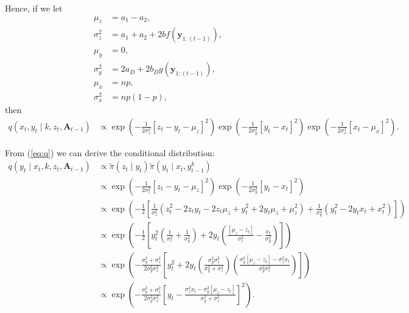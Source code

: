 \documentclass[a4paper]{article}
\newcommand{\by}{\bm{y}}
\newcommand{\bA}{\bm{A}}
\begin{document}
Hence, if we let 
\begin{align*}
    \mu_z &= a_1 - a_2,\\
    \sigma^2_z &= a_1 + a_2 + 2b f\left(\by_{1:(t - 1)}\right),\\
    \mu_y &= 0,\\
    \sigma^2_y &= 2a_D + 2b_D g\left(\by_{1:(t - 1)}\right),\\
    \mu_x &= np,\\
    \sigma^2_x &= np(1 - p),
\end{align*}
then
\begin{align}
    q\left(x_t, y_t \mid k, z_t, \bA_{t - 1}\right) &\propto \exp\left(-\frac{1}{2\sigma^2_z}\left[z_t - y_t - \mu_z\right]^2\right)\exp\left(-\frac{1}{2\sigma^2_y}\left[y_t - x_t\right]^2\right)\exp\left(-\frac{1}{2\sigma^2_x}\left[x_t - \mu_x\right]^2\right).\label{eq:q}
\end{align}

From (\ref{eq:q}) we can derive the conditional distribution:
\begin{align}
    q\left(y_t \mid x_t, k, z_t, \bA_{t - 1}\right) &\propto \tilde{\pi}\left(z_t \mid y_t\right)\tilde{\pi}\left(y_t \mid x_t, y^k_{t - 1}\right)\nonumber\\
    &\propto \exp\left(-\frac{1}{2\sigma^2_z}\left[z_t - y_t - \mu_z\right]^2\right)\exp\left(-\frac{1}{2\sigma^2_y}\left[y_t - x_t\right]^2\right)\nonumber\\
    &\propto \exp\left(-\frac{1}{2}\left[\frac{1}{\sigma^2_z}\left(z^2_t - 2z_ty_t - 2z_t\mu_z + y^2_t + 2y_t\mu_z + \mu^2_z\right) + \frac{1}{\sigma^2_y}\left(y^2_t - 2y_tx_t + x^2_t\right)\right]\right)\nonumber\\
    &\propto \exp\left(-\frac{1}{2}\left[y^2_t\left(\frac{1}{\sigma^2_z} + \frac{1}{\sigma^2_y}\right) + 2y_t\left(\frac{\left[\mu_z - z_t\right]}{\sigma^2_z}  - \frac{x_t}{\sigma^2_y}\right)\right]\right)\nonumber\\
    &\propto \exp\left(-\frac{\sigma^2_y + \sigma^2_z}{2\sigma^2_y\sigma^2_z}\left[y^2_t + 2y_t\left(\frac{\sigma^2_y\sigma^2_z}{\sigma^2_y + \sigma^2_z}\right)\left(\frac{\sigma^2_y \left[\mu_z - z_t\right]  - \sigma^2_z x_t}{\sigma^2_y\sigma^2_z}\right)\right]\right)\nonumber\\
    &\propto \exp\left(-\frac{\sigma^2_y + \sigma^2_z}{2\sigma^2_y\sigma^2_z}\left[y_t - \frac{\sigma^2_z x_t - \sigma^2_y \left[\mu_z - z_t\right]}{\sigma^2_y + \sigma^2_z}\right]^2\right).\label{eq:qcondy}
\end{align}
\end{document}
